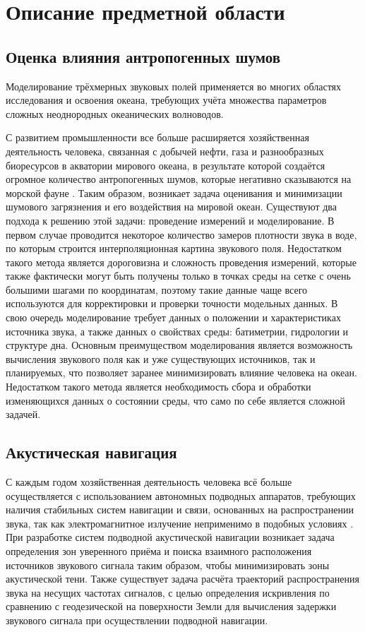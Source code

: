 \documentclass[../document.tex]{subfiles}
\begin{document}
	\section{Описание предметной области}
		\subsection{Оценка влияния антропогенных шумов}
			\par Моделирование трёхмерных звуковых полей применяется во многих областях исследования и освоения океана, требующих учёта множества параметров сложных неоднородных океанических волноводов.
			\par С развитием промышленности все больше расширяется хозяйственная деятельность человека, связанная с добычей нефти, газа и разнообразных биоресурсов в акватории мирового океана, в результате которой создаётся огромное количество антропогенных шумов, которые негативно сказываются на морской фауне \cite{noise1, noise2}. Таким образом, возникает задача оценивания и минимизации шумового загрязнения и его воздействия на мировой океан. Существуют два подхода к решению этой задачи: проведение измерений и моделирование. В первом случае проводится некоторое количество замеров плотности звука в воде, по которым строится интерполяционная картина звукового поля. Недостатком такого метода является дороговизна и сложность проведения измерений, которые также фактически могут быть получены только в точках среды на сетке с очень большими шагами по координатам, поэтому такие данные чаще всего используются для корректировки и проверки точности модельных данных. В свою очередь моделирование требует данных о положении и характеристиках источника звука, а также данных о свойствах среды: батиметрии, гидрологии и структуре дна. Основным преимуществом моделирования является возможность вычисления звукового поля как и уже существующих источников, так и планируемых, что позволяет заранее минимизировать влияние человека на океан. Недостатком такого метода является необходимость сбора и обработки изменяющихся данных о состоянии среды, что само по себе является сложной задачей.
		\subsection{Акустическая навигация}
			\par С каждым годом хозяйственная деятельность человека всё больше осуществляется с использованием автономных подводных аппаратов, требующих наличия стабильных систем навигации и связи, основанных на распространении звука, так как электромагнитное излучение неприменимо в подобных условиях \cite{navigation19,navigation20}. При разработке систем подводной акустической навигации возникает задача определения зон уверенного приёма и поиска взаимного расположения источников звукового сигнала таким образом, чтобы минимизировать зоны акустической тени. Также существует задача расчёта траекторий распространения звука на несущих частотах сигналов, с целью определения искривления по сравнению с геодезической на поверхности Земли для вычисления задержки звукового сигнала при осуществлении подводной навигации.
\end{document}
